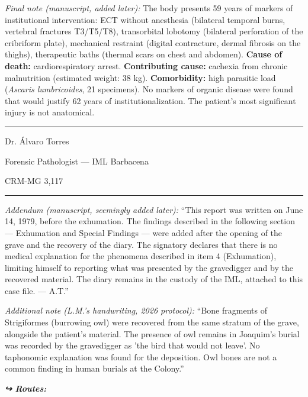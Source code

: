 \noindent \textit{Final note (manuscript, added later):} The body presents 59 years of markers of institutional intervention: ECT without anesthesia (bilateral temporal burns, vertebral fractures T3/T5/T8), transorbital lobotomy (bilateral perforation of the cribriform plate), mechanical restraint (digital contracture, dermal fibrosis on the thighs), therapeutic baths (thermal scars on chest and abdomen). \textbf{Cause of death:} cardiorespiratory arrest. \textbf{Contributing cause:} cachexia from chronic malnutrition (estimated weight: 38 kg). \textbf{Comorbidity:} high parasitic load (\textit{Ascaris lumbricoides}, 21 specimens). No markers of organic disease were found that would justify 62 years of institutionalization. The patient's most significant injury is not anatomical.

\vspace{0.5em}\noindent\rule{\textwidth}{0.5pt}\vspace{0.5em}

\noindent Dr. Álvaro Torres

\noindent Forensic Pathologist --- IML Barbacena

\noindent CRM-MG 3,117

\vspace{0.5em}\noindent\rule{\textwidth}{0.5pt}\vspace{0.5em}

\noindent \textit{Addendum (manuscript, seemingly added later):} ``This report was written on June 14, 1979, before the exhumation. The findings described in the following section --- Exhumation and Special Findings --- were added after the opening of the grave and the recovery of the diary. The signatory declares that there is no medical explanation for the phenomena described in item 4 (Exhumation), limiting himself to reporting what was presented by the gravedigger and by the recovered material. The diary remains in the custody of the IML, attached to this case file. --- A.T.''

\noindent \textit{Additional note (L.M.'s handwriting, 2026 protocol):} ``Bone fragments of Strigiformes (burrowing owl) were recovered from the same stratum of the grave, alongside the patient's material. The presence of owl remains in Joaquim's burial was recorded by the gravedigger as 'the bird that would not leave'. No taphonomic explanation was found for the deposition. Owl bones are not a common finding in human burials at the Colony.''

\noindent\textit{\textbf{↪ Routes:}  \rotasep {} \rotasep {} \rotasep {}}
